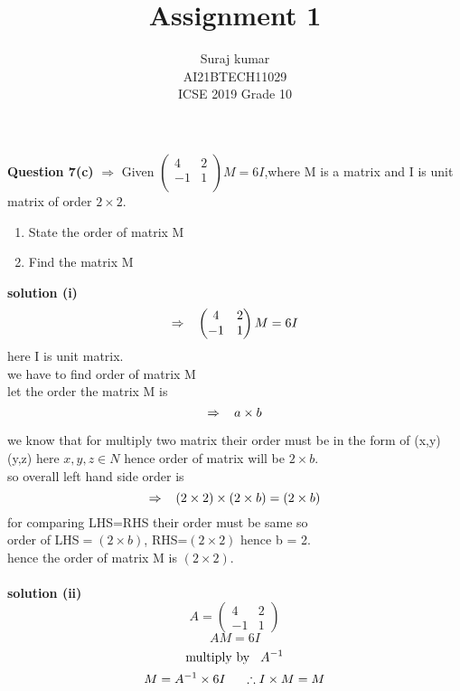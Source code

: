 \documentclass[journal,12pt,twocolumn]{IEEEtran}
\title{Assignment 1}
\author{Suraj kumar \\ \normalsize AI21BTECH11029\\\vspace*{20pt} \Large ICSE 2019 Grade 10}
\newcommand{\myvec}[1]{\ensuremath{\begin{pmatrix}#1\end{pmatrix}}}
\begin{document}
\maketitle
\textbf{Question 7(c)} $\Rightarrow$ Given $\myvec{
     4 & 2 \\
     -1 & 1 \\
      }M=6I$,where M is a matrix and I is unit matrix of order $2\times 2.$
		\begin{enumerate}[label=(\roman*)]
		\item State the order of matrix M
		\item Find the matrix M
	\end{enumerate}	
 \textbf{solution (i) } $$\Rightarrow  \hspace{3mm} \myvec{
     4 & 2 \\
     -1 & 1 
      }M=6I$$  
    here I is unit matrix.\\
    we have to find order of matrix M\\
    let the order the matrix M is  $$ \Rightarrow \hspace{3mm} a\times b$$
      
      we know that for multiply two matrix their order must be in the form of  (x,y) (y,z)  here $x,y,z \in N$
      hence order of matrix will be $2\times b$.\\
      so overall left hand side order is  $$\Rightarrow \hspace{3mm} (2\times 2)\times(2\times b) =(2\times b)$$
      for comparing LHS=RHS their order must be same so \\
      order of LHS$=(2\times b)$,
      RHS=$(2\times 2)$  hence b = 2.\\
      hence the order of matrix M is $(2\times 2).$\\\\

\textbf{solution (ii)}\\
\begin{equation}
    A=\myvec{
      4 & 2\\
      -1 & 1
     }
     \end{equation}
     \begin{equation}
       AM=6I
     \end{equation}
    \begin{equation}
    \text{multiply by}\hspace{3mm} A^{-1}
    \end{equation}
    \begin{equation}
    M=A^{-1}\times 6I \hspace{5mm} \therefore I\times M=M
    \end{equation}     
   
\end{document}
